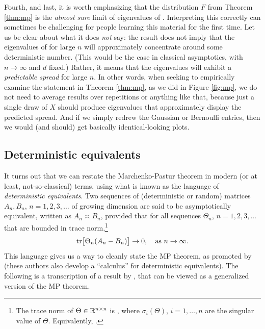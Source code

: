 \documentclass{article}
\begin{document}
Fourth, and last, it is worth emphasizing that the distribution $F$ from Theorem 
\ref{thm:mp} is the \emph{almost sure} limit of eigenvalues of . Interpreting this correctly can sometimes be challenging for
people learning this material for the first time. Let us be clear about what it
does \emph{not} say: the result does not imply that the eigenvalues of
\smash{$\hSigma$} for large $n$ will approximately concentrate around some
deterministic number. (This would be the case in classical asymptotics, with $n
\to \infty$ and $d$ fixed.) Rather, it means that the eigenvalues will exhibit a
\emph{predictable spread} for large $n$. In other words, when seeking to
empirically examine the statement in Theorem \ref{thm:mp}, as we did in Figure
\ref{fig:mp}, we do not need to average results over repetitions or anything
like that, because just a single draw of $X$ should produce eigenvalues that
approximately display the predicted spread. And if we simply redrew the Gaussian 
or Bernoulli entries, then we would (and should) get basically identical-looking
plots.   

\subsection{Deterministic equivalents}

It turns out that we can restate the Marchenko-Pastur theorem in modern (or at
least, not-so-classical) terms, using what is known as the language of
\emph{deterministic equivalents}. Two sequences of (deterministic or random)
matrices $A_n,B_n$, $n=1,2,3,\dots$ of growing dimension are said to be
asymptotically equivalent, written as $A_n \asymp B_n$, provided that for all
sequences $\Theta_n$, $n=1,2,3,\ldots$ that are bounded in trace
norm,\footnote{The trace norm of $\Theta \in \mathbb{R}^{n \times n}$ is
  , where
  $\sigma_i(\Theta)$, $i=1,\dots,n$ are the singular value of
  $\Theta$. Equivalently, .}   
\[
\mathrm{tr} \big[ \Theta_n (A_n - B_n) \big] \to 0, \quad \text{as $n \to \infty$}. 
\]
This language gives us a way to cleanly state the MP theorem, as promoted by
\citet{dobriban2021distributed} (these authors also develop a ``calculus'' for
deterministic equivalents). The following is a transcription of a result by
\citet{rubio2011spectral}, that can be viewed as a generalized version of the
MP theorem.  
\end{document}
